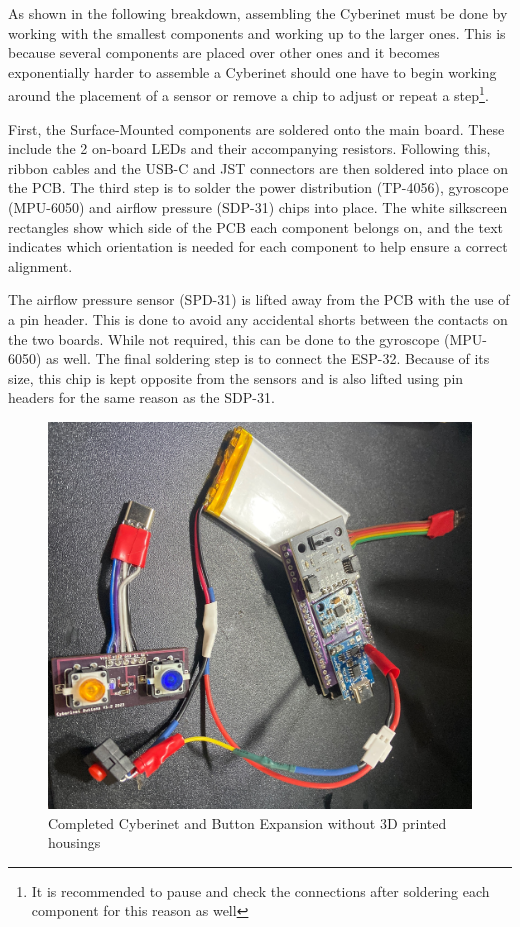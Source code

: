 As shown in the following breakdown, assembling the Cyberinet must be done by working with the smallest components and working up to the larger ones. This is because several components are placed over other ones and it becomes exponentially harder to assemble a Cyberinet should one have to begin working around the placement of a sensor or remove a chip to adjust or repeat a step\footnote{It is recommended to pause and check the connections after soldering each component for this reason as well}.

First, the Surface-Mounted components are soldered onto the main board. These include the 2 on-board LEDs and their accompanying resistors. Following this, ribbon cables and the USB-C and JST connectors are then soldered into place on the PCB. The third step is to solder the power distribution (TP-4056), gyroscope (MPU-6050) and airflow pressure (SDP-31) chips into place. The white silkscreen rectangles show which side of the PCB each component belongs on, and the text indicates which orientation is needed for each component to help ensure a correct alignment.

The airflow pressure sensor (SPD-31) is lifted away from the PCB with the use of a pin header. This is done to avoid any accidental shorts between the contacts on the two boards. While not required, this can be done to the gyroscope (MPU-6050) as well. The final soldering step is to connect the ESP-32. Because of its size, this chip is kept opposite from the sensors and is also lifted using pin headers for the same reason as the SDP-31.

\begin{center}
    \begin{figure}
        \centering
        \includegraphics[scale=0.1, angle=90]{diagrams/builtUnits/noCase.JPG}
        \caption{Completed Cyberinet and Button Expansion without 3D printed housings}
        \label{fig:CyberinetNoCase}
    \end{figure}
\end{center}

